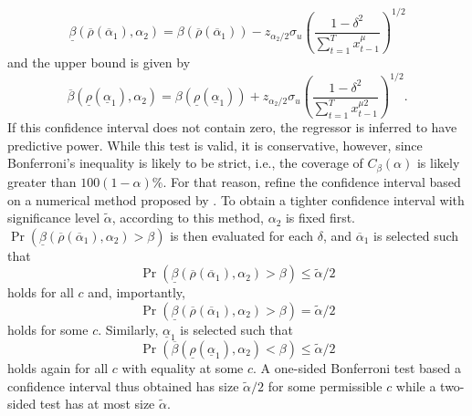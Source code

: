 \documentclass{article}
\begin{document}
\begin{equation}
\underline{\beta}\left(\overline{\rho}\left(\overline{\alpha}_{1}\right), \alpha_{2}\right)=\beta \left(\overline{\rho}\left(\overline{\alpha}_{1}\right) \right)-z_{\alpha_{2} / 2} \sigma_{u}\left(\frac{1-\delta^{2}}{\sum_{t=1}^{T} x_{t-1}^{\mu}}\right)^{1 / 2}
\end{equation}
and the upper bound is given by
\begin{equation}
\overline{\beta}\left(\underline{\rho}\left(\underline{\alpha}_{1}\right), \alpha_{2}\right)=\beta \left(\underline{\rho}\left(\underline{\alpha}_{1}\right) \right)+z_{\alpha_{2} / 2} \sigma_{u}\left(\frac{1-\delta^{2}}{\sum_{t=1}^{T} x_{t-1}^{\mu 2}}\right)^{1 / 2}.
\end{equation}
If this confidence interval does not contain zero, the regressor is inferred to have predictive power. While this test is valid, it is conservative, however, since Bonferroni's inequality is likely to be strict, i.e., the coverage of $C_{\beta}(\alpha)$ is likely greater than $100(1-\alpha) \%$. For that reason, \citet{campbell2006efficient} refine the confidence interval based on a numerical method proposed by \citet{cavaliere2005unit}. To obtain a tighter confidence interval with significance level $\widetilde{\alpha}$, according to this method, $\alpha_{2}$ is fixed first. $\operatorname{Pr}\left(\underline{\beta}\left(\overline{\rho}\left(\overline{\alpha}_{1}\right), \alpha_{2}\right)>\beta\right)$ is then evaluated for each $\delta$, and $\overline{\alpha}_{1}$ is selected such that 
\begin{equation}
\operatorname{Pr}\left(\underline{\beta}\left(\overline{\rho}\left(\overline{\alpha}_{1}\right),\alpha_{2}\right)>\beta\right) \leq \widetilde{\alpha} / 2\end{equation}
holds for all $c$ and, importantly,
\begin{equation}
\operatorname{Pr}\left(\underline{\beta}\left(\overline{\rho}\left(\overline{\alpha}_{1}\right), \alpha_{2}\right)>\beta\right) = \widetilde{\alpha} / 2
\end{equation}
holds for some $c$. 
Similarly, $\underline{\alpha}_{1}$ is selected such that 
\begin{equation}
\operatorname{Pr}\left(\overline{\beta}\left(\underline{\rho}\left(\underline{\alpha}_{1}\right), \alpha_{2}\right)<\beta\right) \leq \widetilde{\alpha} / 2
\end{equation}
holds again for all $c$ with equality at some $c$. A one-sided Bonferroni test based a confidence interval thus obtained has size $\widetilde{\alpha} / 2$ for some permissible $c$ while a two-sided test has at most size $\widetilde{\alpha}$.  
\end{document}
